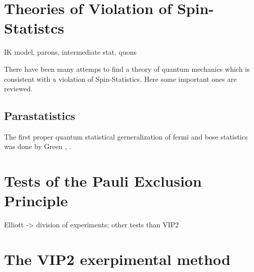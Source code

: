 \section{Theories of Violation of Spin-Statistcs}

IK model, parons, intermediate stat, quons

There have been many attemps to find a theory of quantum mechanics which is consistent with a violation of Spin-Statistics. Here some important ones are reviewed.

\subsection{Parastatistics}

The first proper quantum statistical gerneralization of fermi and bose statistics was done by Green \cite{Green1953}, \cite{Greenberg2000}. 


\section{Tests of the Pauli Exclusion Principle}

Elliott -> division of experiments; other tests than VIP2

\section{The VIP2 exerpimental method}